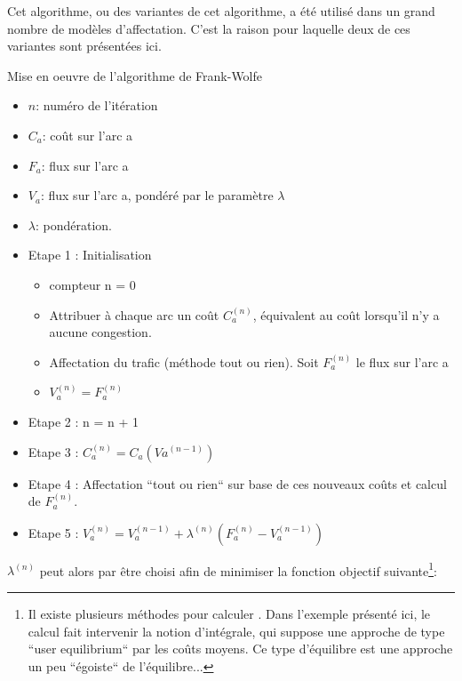Cet algorithme, ou des variantes de cet algorithme, a été utilisé
dans un grand nombre de modèles d'affectation. C'est la raison pour
laquelle deux de ces variantes sont présentées ici.

Mise en oeuvre de l'algorithme de Frank-Wolfe


\begin{itemize}
\item $n$: numéro de l'itération
\item $C_a$: coût sur l'arc a
\item $F_a$: flux sur l'arc a
\item $V_a$: flux sur l'arc a, pondéré par le paramètre $\lambda$
\item $\lambda$: pondération.
\end{itemize}

\begin{itemize}
\item Etape 1 : Initialisation

\begin{itemize}
\item compteur n = 0
\item Attribuer à chaque arc un coût $C_a^{(n)}$, équivalent au coût lorsqu'il
n'y a aucune congestion.
\item Affectation du trafic (méthode tout ou rien). Soit $F_a^{(n)}$ le flux
sur l'arc a
\item $V_a^{(n)} = F_a^{(n)}$
\end{itemize}

\item Etape 2 : n = n + 1

\item Etape 3 : $C_a^{(n)} = C_a(Va^{(n-1)})$

\item Etape 4 : Affectation ``tout ou rien`` sur base de ces nouveaux coûts
et calcul de $F_a^{(n)}$.

\item Etape 5 : $V_a^{(n)} = V_a^{(n-1)} + \lambda ^{(n)}(F_a^{(n)} - V_a^{(n-1)})$
\end{itemize}





$\lambda^{(n)}$ peut alors par être choisi afin de minimiser la fonction objectif
suivante\footnote{Il existe plusieurs méthodes pour calculer . Dans l'exemple
présenté ici, le calcul fait intervenir la notion d'intégrale, qui suppose une
approche de type ``user equilibrium`` par les coûts moyens. Ce type d'équilibre
est une approche un peu ``égoiste`` de l'équilibre...}:


